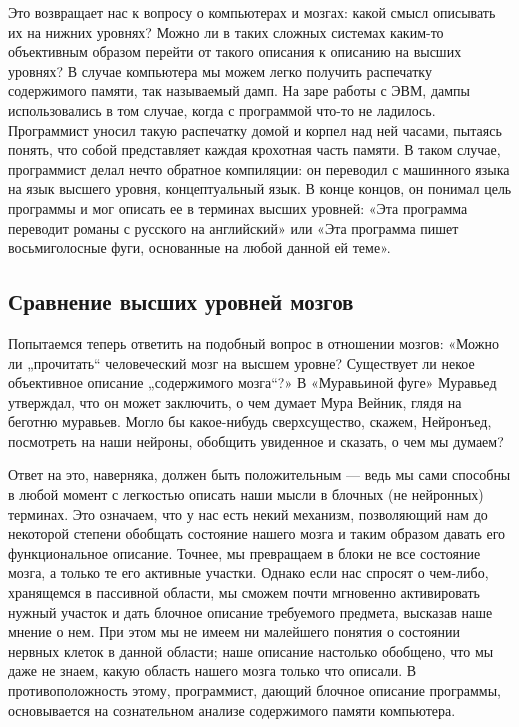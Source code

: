 \documentclass[../main.tex]{subfiles}
\begin{document}
Это возвращает нас к вопросу о компьютерах и мозгах: какой смысл описывать их на нижних уровнях? Можно ли в таких сложных системах каким-то объективным образом перейти от такого описания к описанию на высших уровнях? В случае компьютера мы можем легко получить распечатку содержимого памяти, так называемый дамп. На заре работы с ЭВМ, дампы использовались в том случае, когда с программой что-то не ладилось. Программист уносил такую распечатку домой и корпел над ней часами, пытаясь понять, что собой представляет каждая крохотная часть памяти. В таком случае, программист делал нечто обратное компиляции: он переводил с машинного языка на язык высшего уровня, концептуальный язык. В конце концов, он понимал цель программы и мог описать ее в терминах высших уровней: «Эта программа переводит романы с русского на английский» или «Эта программа пишет восьмиголосные фуги, основанные на любой данной ей теме».


\subsection{Сравнение высших уровней мозгов}

Попытаемся теперь ответить на подобный вопрос в отношении мозгов: «Можно ли „прочитать`` человеческий мозг на высшем уровне? Существует ли некое объективное описание „содержимого мозга``?» В «Муравьиной фуге» Муравьед утверждал, что он может заключить, о чем думает Мура Вейник, глядя на беготню муравьев. Могло бы какое-нибудь сверхсущество, скажем, Нейронъед, посмотреть на наши нейроны, обобщить увиденное и сказать, о чем мы думаем?

Ответ на это, наверняка, должен быть положительным --- ведь мы сами способны в любой момент с легкостью описать наши мысли в блочных (не нейронных) терминах. Это означаем, что у нас есть некий механизм, позволяющий нам до некоторой степени обобщать состояние нашего мозга и таким образом давать его функциональное описание. Точнее, мы превращаем в блоки не все состояние мозга, а только те его активные участки. Однако если нас спросят о чем-либо, хранящемся в пассивной области, мы сможем почти мгновенно активировать нужный участок и дать блочное описание требуемого предмета, высказав наше мнение о нем. При этом мы не имеем ни малейшего понятия о состоянии нервных клеток в данной области; наше описание настолько обобщено, что мы даже не знаем, какую область нашего мозга только что описали. В противоположность этому, программист, дающий блочное описание программы, основывается на сознательном анализе содержимого памяти компьютера.
\end{document}
